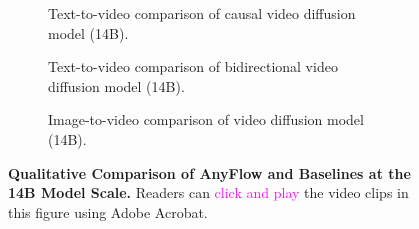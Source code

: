 \begin{figure}[!tb]
    \centering
    \begin{subfigure}[b]{\linewidth}
        \centering
        \caption{Text-to-video comparison of causal video diffusion model (14B).}
    \end{subfigure}
    \hfill 
    \begin{subfigure}[b]{\linewidth}
        \centering
        \caption{Text-to-video comparison of bidirectional video diffusion model (14B).}
    \end{subfigure}
    \hfill 
    \begin{subfigure}[b]{\linewidth}
        \centering
        \caption{Image-to-video comparison of video diffusion model (14B).}
    \end{subfigure}
    \caption{\textbf{Qualitative Comparison of AnyFlow and Baselines at the 14B Model Scale.} Readers can \textcolor{magenta}{click and play} the video clips in this figure using Adobe Acrobat.}
\label{fig:14b_compare}
\end{figure}
